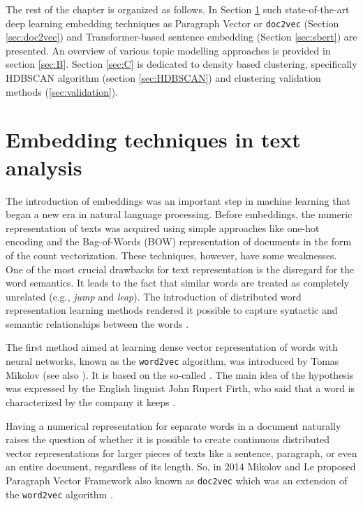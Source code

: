\documentclass[fontsize=12pt,a4paper,twoside,openany]{scrbook}
\begin{document}
The rest of the chapter is organized as follows. In Section \ref{sec:A} such state-of-the-art deep learning embedding techniques as Paragraph Vector or \verb|doc2vec| (Section \ref{sec:doc2vec}) and Transformer-based sentence embedding (Section \ref{sec:sbert}) are presented. An overview of various topic modelling approaches is provided in section \ref{sec:B}. Section \ref{sec:C} is dedicated to density based clustering, specifically HDBSCAN algorithm (section \ref{sec:HDBSCAN}) and clustering validation methods (\ref{sec:validation}).  

\section{Embedding techniques in text analysis}
\label{sec:A}

The introduction of embeddings was an important step in machine learning that began a new era in natural language processing. Before embeddings, the numeric representation of texts was acquired using simple approaches like one-hot encoding and the Bag-of-Words (BOW) representation of documents in the form of the count vectorization. These techniques, however, have some weaknesses. One of the most crucial drawbacks for text representation is the disregard for the word semantics. It leads to the fact that similar words are treated as completely unrelated (e.g., \emph{jump} and \emph{leap}). The introduction of distributed word representation learning methods rendered it possible to capture syntactic and semantic relationships between the words \parencite{Le14}.

The first method aimed at learning dense vector representation of words with neural networks, known as the \verb|word2vec| algorithm, was introduced by Tomas Mikolov \parencite{TMikolov13} (see also \parencite{Mikolov13}). It is based on the so-called  \parencite{Harris54}. The main idea of the hypothesis was expressed by the English linguist John Rupert Firth, who said that a word is characterized by the company it keeps \parencite{Firth57}.

Having a numerical representation for separate words in a document naturally raises the question of whether it is possible to create continuous distributed vector representations for larger pieces of texts like a sentence, paragraph, or even an entire document, regardless of its length. So, in 2014 Mikolov and Le proposed Paragraph Vector Framework also known as \verb|doc2vec| which was an extension of the \verb|word2vec| algorithm \parencite[see][]{Le14}.
\end{document}
